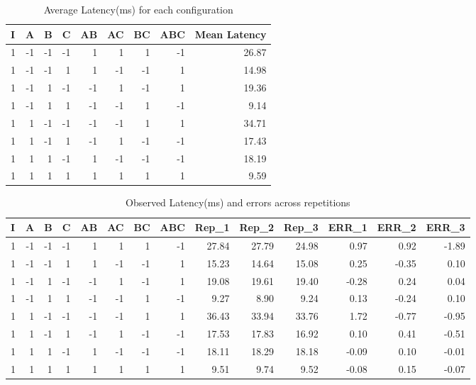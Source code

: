 \documentclass[11pt,a4paper]{article}
\begin{document}
\begin{table}[H]
	\caption{Average Latency(ms) for each configuration}
	\centering
	\begin{tabular}{|r|r|r|r|r|r|r|r|r|}
		\hline
		\multicolumn{1}{|l|}{I} & \multicolumn{1}{l|}{A} & \multicolumn{1}{l|}{B} & \multicolumn{1}{l|}{C} & \multicolumn{1}{l|}{AB} & \multicolumn{1}{l|}{AC} & \multicolumn{1}{l|}{BC} & \multicolumn{1}{l|}{ABC} & \multicolumn{1}{l|}{Mean Latency} \\ \hline
		1 & -1 & -1 & -1 & 1 & 1 & 1 & -1 & 26.87 \\ \hline
		1 & -1 & -1 & 1 & 1 & -1 & -1 & 1 & 14.98 \\ \hline
		1 & -1 & 1 & -1 & -1 & 1 & -1 & 1 & 19.36 \\ \hline
		1 & -1 & 1 & 1 & -1 & -1 & 1 & -1 & 9.14 \\ \hline
		1 & 1 & -1 & -1 & -1 & -1 & 1 & 1 & 34.71 \\ \hline
		1 & 1 & -1 & 1 & -1 & 1 & -1 & -1 & 17.43 \\ \hline
		1 & 1 & 1 & -1 & 1 & -1 & -1 & -1 & 18.19 \\ \hline
		1 & 1 & 1 & 1 & 1 & 1 & 1 & 1 & 9.59 \\ \hline
	\end{tabular}
	\label{}
\end{table}

\begin{table}[H]
	\caption{Observed Latency(ms) and errors across repetitions}
	\centering
	\begin{tabular}{|r|r|r|r|r|r|r|r|r|r|r|r|r|r|}
		\hline
		\multicolumn{1}{|l|}{I} & \multicolumn{1}{l|}{A} & \multicolumn{1}{l|}{B} & \multicolumn{1}{l|}{C} & \multicolumn{1}{l|}{AB} & \multicolumn{1}{l|}{AC} & \multicolumn{1}{l|}{BC} & \multicolumn{1}{l|}{ABC} & \multicolumn{1}{l|}{Rep\_1} & \multicolumn{1}{l|}{Rep\_2} & \multicolumn{1}{l|}{Rep\_3} & \multicolumn{1}{l|}{ERR\_1} & \multicolumn{1}{l|}{ERR\_2} & \multicolumn{1}{l|}{ERR\_3} \\ \hline
		1 & -1 & -1 & -1 & 1 & 1 & 1 & -1 & 27.84 & 27.79 & 24.98 & 0.97 & 0.92 & -1.89 \\ \hline
		1 & -1 & -1 & 1 & 1 & -1 & -1 & 1 & 15.23 & 14.64 & 15.08 & 0.25 & -0.35 & 0.10 \\ \hline
		1 & -1 & 1 & -1 & -1 & 1 & -1 & 1 & 19.08 & 19.61 & 19.40 & -0.28 & 0.24 & 0.04 \\ \hline
		1 & -1 & 1 & 1 & -1 & -1 & 1 & -1 & 9.27 & 8.90 & 9.24 & 0.13 & -0.24 & 0.10 \\ \hline
		1 & 1 & -1 & -1 & -1 & -1 & 1 & 1 & 36.43 & 33.94 & 33.76 & 1.72 & -0.77 & -0.95 \\ \hline
		1 & 1 & -1 & 1 & -1 & 1 & -1 & -1 & 17.53 & 17.83 & 16.92 & 0.10 & 0.41 & -0.51 \\ \hline
		1 & 1 & 1 & -1 & 1 & -1 & -1 & -1 & 18.11 & 18.29 & 18.18 & -0.09 & 0.10 & -0.01 \\ \hline
		1 & 1 & 1 & 1 & 1 & 1 & 1 & 1 & 9.51 & 9.74 & 9.52 & -0.08 & 0.15 & -0.07 \\ \hline
	\end{tabular}
	\label{}
\end{table}
\end{document}
